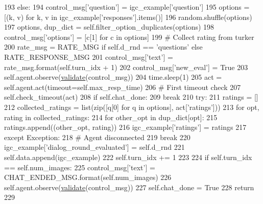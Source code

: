 \begin{DoxyCode}
193             \textcolor{keywordflow}{else}:
194                 control\_msg[\textcolor{stringliteral}{'question'}] = igc\_example[\textcolor{stringliteral}{'question'}]
195                 options = [(k, v) \textcolor{keywordflow}{for} k, v \textcolor{keywordflow}{in} igc\_example[\textcolor{stringliteral}{'responses'}].items()]
196             random.shuffle(options)
197             options, dup\_dict = self.filter\_option\_duplicates(options)
198             control\_msg[\textcolor{stringliteral}{'options'}] = [c[1] \textcolor{keywordflow}{for} c \textcolor{keywordflow}{in} options]
199             \textcolor{comment}{# Collect rating from turker}
200             rate\_msg = RATE\_MSG \textcolor{keywordflow}{if} self.d\_rnd == \textcolor{stringliteral}{'questions'} \textcolor{keywordflow}{else} RATE\_RESPONSE\_MSG
201             control\_msg[\textcolor{stringliteral}{'text'}] = rate\_msg.format(self.turn\_idx + 1)
202             control\_msg[\textcolor{stringliteral}{'new\_eval'}] = \textcolor{keyword}{True}
203             self.agent.observe(\hyperlink{namespaceparlai_1_1core_1_1worlds_afc3fad603b7bce41dbdc9cdc04a9c794}{validate}(control\_msg))
204             time.sleep(1)
205             act = self.agent.act(timeout=self.max\_resp\_time)
206             \textcolor{comment}{# First timeout check}
207             self.check\_timeout(act)
208             \textcolor{keywordflow}{if} self.chat\_done:
209                 \textcolor{keywordflow}{break}
210             \textcolor{keywordflow}{try}:
211                 ratings = []
212                 collected\_ratings = list(zip([q[0] \textcolor{keywordflow}{for} q \textcolor{keywordflow}{in} options], act[\textcolor{stringliteral}{'ratings'}]))
213                 \textcolor{keywordflow}{for} opt, rating \textcolor{keywordflow}{in} collected\_ratings:
214                     \textcolor{keywordflow}{for} other\_opt \textcolor{keywordflow}{in} dup\_dict[opt]:
215                         ratings.append((other\_opt, rating))
216                 igc\_example[\textcolor{stringliteral}{'ratings'}] = ratings
217             \textcolor{keywordflow}{except} Exception:
218                 \textcolor{comment}{# Agent disconnected}
219                 \textcolor{keywordflow}{break}
220             igc\_example[\textcolor{stringliteral}{'dialog\_round\_evaluated'}] = self.d\_rnd
221             self.data.append(igc\_example)
222             self.turn\_idx += 1
223 
224         \textcolor{keywordflow}{if} self.turn\_idx == self.num\_images:
225             control\_msg[\textcolor{stringliteral}{'text'}] = CHAT\_ENDED\_MSG.format(self.num\_images)
226             self.agent.observe(\hyperlink{namespaceparlai_1_1core_1_1worlds_afc3fad603b7bce41dbdc9cdc04a9c794}{validate}(control\_msg))
227         self.chat\_done = \textcolor{keyword}{True}
228         \textcolor{keywordflow}{return}
229 
\end{DoxyCode}
